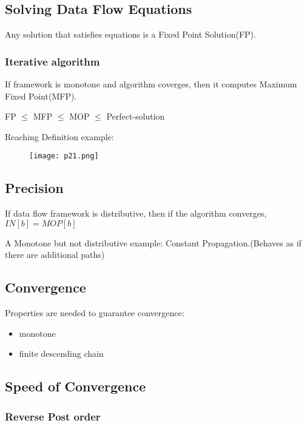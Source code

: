 \subsection{Solving Data Flow Equations}

Any solution that satisfies equations is a Fixed Point Solution(FP).


\subsubsection{Iterative algorithm }

If framework is monotone and algorithm coverges, then it computes Maximum Fixed Point(MFP).


FP $\leq$ MFP $\leq$ MOP $\leq$ Perfect-solution


Reaching Definition example:
\begin{figure}[h]
    \centering
    \texttt{[image: p21.png]}
    \caption{}
    \label{fig:p21}
\end{figure}




\subsection{Precision}

If data flow framework is distributive, then if the algorithm converges, $IN[b] = MOP[b]$

A Monotone but not distributive example: Constant Propagation.(Behaves as if there are additional paths)



\subsection{Convergence}
Properties are needed to guarantee convergence:

\begin{itemize}
    \item monotone
    \item finite descending chain
\end{itemize}



\subsection{Speed of Convergence}

\subsubsection{Reverse Post order}

